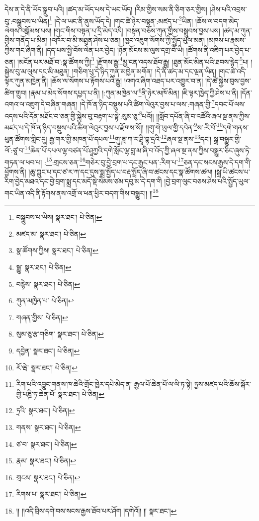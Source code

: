 དེས་ན་དེ་ནི་ཡོད་སྒྲུབ་པའི། །ཚད་མ་ཡོད་པས་དེ་ཡང་ཡོད། །རིམ་གྱིས་སམ་ནི་ཅིག་ཅར་གྱིས། །ཤེས་པའི་འབྲས་བུ་:བསྒྲུབས་པ་ཡིན།\footnote{བསྒྲུབས་པ་ཡིས།  སྣར་ཐང་།  པེ་ཅིན། } །དེ་ལ་ཡང་ནི་ནུས་ཡོད་དེ། །གང་ཚེ་ཉེར་བསྟན་:མཛད་པ་\footnote{མཛད་མ་  སྣར་ཐང་།  པེ་ཅིན། }ཡིན། །ཆོས་ལ་བདག་མེད་ལེགས་བསྒོམས་པས། །གང་གིས་བསྟན་པ་དྲི་མེད་འདི། །བསྟན་བཅོས་ཀུན་གྱིས་བསྒྲུབས་བྱས་པས། །ཚད་མ་ཀུན་གྱིས་གནོད་པ་མིན། །འཁོར་བ་མི་མཐུན་ཤེས་པ་ཅན། །ཁྱབ་འཇུག་སོགས་ཀྱི་སྤྱོད་ཡུལ་མན། །མཁས་པ་རྣམས་ཀྱིས་གང་ཞིག་ནི། །དད་པས་སྤྱི་བོས་ལེན་པར་བྱེད། །ཉོན་མོངས་མ་ལུས་དགྲ་བོ་ཡི། །ཚོགས་ནི་འཇིག་པར་བྱེད་པ་ཅན། །མངོན་པར་མཐོ་བ་:སྣ་ཚོགས་ཀྱི།\footnote{སྣ་ཚོགས་ཀྱིས།  སྣར་ཐང་།  པེ་ཅིན། } །རྫོགས་རྒྱུ་\footnote{སྒྱུ་  སྣར་ཐང་།  པེ་ཅིན། }མྱ་ངན་འདས་ཐོབ་རྒྱུ། །ཐུན་མོང་མིན་པའི་ཐབས་རྙེད་\footnote{བརྙེས་  སྣར་ཐང་།  པེ་ཅིན། }པ། །སྐྱེས་བུ་མ་ལུས་དང་མི་མཐུན། །གཅིག་པུ་དེ་ཉིད་ཀུན་མཁྱེན་མགོན། །དེ་ནི་ཚད་མ་དང་ལྡན་ཡིན། །གང་ཚེ་འདི་ལྟར་ཀུན་མཁྱེན་ནི། །ཆོས་ལ་སོགས་པ་རྟོགས་པའི་རྒྱུ། །འགའ་ཞིག་འཐད་པར་འགྱུར་བ་ན། །དེ་ཚེ་སྐྱེས་བུས་བྱས་ཚིག་གྲུབ། །རྣམ་པ་མེད་སོགས་དཔྱད་པ་ནི། །:ཀུན་མཁྱེན་ལ་\footnote{ཀུན་མཁྱེན་པ་  པེ་ཅིན། }ནི་ཉེར་མཁོ་མིན། །ཇི་ལྟར་ཁྱེད་ཀྱི་ཤེས་པ་ནི། །དོན་འགའ་ལ་འཇུག་དེ་བཞིན་གཞན། །དེ་ཁོ་ན་ཉིད་བསྡུས་པའི་ཚིག་ལེའུར་བྱས་པ་ལས་:གཞན་གྱི་\footnote{གཞན་གྱིས་  པེ་ཅིན། }དབང་པོ་ལས་འདས་པའི་དོན་མཐོང་བ་ཅན་གྱི་སྐྱེས་བུ་བརྟག་པ་སྟེ་:སུམ་ཅུ་\footnote{སུམ་ཅུ་རྩ་གཅིག་  སྣར་ཐང་།  པེ་ཅིན། }པའོ།། །།སློབ་དཔོན་ཞི་བ་འཚོའི་ཞལ་སྔ་ནས་ཀྱིས་མཛད་པ་དེ་ཁོ་ན་ཉིད་བསྡུས་པའི་ཚིག་ལེའུར་བྱས་པ་རྫོགས་སོ།། །།གུ་གེ་ཡུལ་གྱི་དབེན་\footnote{དབྱེན་  སྣར་ཐང་།  པེ་ཅིན། }ས་:རི་བོ་\footnote{རོ་ཝེ་  སྣར་ཐང་།  པེ་ཅིན། }དགེ་གནས་ཕུན་ཚོགས་གླིང་དུ། རྒྱ་གར་གྱི་མཁན་པོ་དཔལ་\footnote{རིག་པའི་འབྱུང་གནས་ཁ་ཆེའི་གྲོང་ཁྱེར་དཔེ་མེད་ན། རྒྱལ་པོ་ཆེན་པོ་ལ་ལི་ཏ་སྟེ། ཏྱས་མཛད་པའི་ཆོས་སྐོར་གྱི་པཎྜི་ཏ་ཆེན་པོ་  སྣར་ཐང་།  པེ་ཅིན། }གུ་ཎཱ་ཀ་ར་ཤྲཱི་བྷ་དྲའི་\footnote{ཏྲའི་  སྣར་ཐང་།  པེ་ཅིན། }ཞལ་སྔ་ནས་\footnote{གནས་  སྣར་ཐང་།  པེ་ཅིན། }དང་། སྒྲ་བསྒྱུར་གྱི་ལོ་:ཙཱ་བ་\footnote{ཙ་བ་  སྣར་ཐང་།  པེ་ཅིན། }ཆེན་པོ་དཔལ་ལྷ་བཙན་པོ་ཤཱཀྱའི་དགེ་སློང་ལྷ་བླ་མ་ཞི་བ་འོད་ཀྱི་ཞལ་སྔ་ནས་ཀྱིས་བསྒྱུར་ཅིང་ཞུས་ཏེ་གཏན་ལ་ཕབ་པ། :\footnote{རྣམ་  སྣར་ཐང་།  པེ་ཅིན། }:གྲངས་ཅན་\footnote{གྲངས་  སྣར་ཐང་།  པེ་ཅིན། }གཅེར་བུ་བྱེ་བྲག་པ་དང་རྒྱང་པན་:རིག་པ་\footnote{རིགས་པ་  སྣར་ཐང་།  པེ་ཅིན། }ཅན་དང་སངས་རྒྱས་དེ་དག་གི་ཕྱོགས་ནི། །ཆུ་ཀླུང་པ་དང་ཙ་ར་ཀ་དང་དུས་སྨྲ་སྤྱོད་པ་བརྡ་སྤྲོད་ཞི་བ་ཚངས་དང་སྣ་ཚོགས་ཚལ། །སྒྲ་ཡི་ཚངས་པ་རིག་བྱེད་མཐའ་དང་བྱེ་བྲག་སྨྲ་དང་མདོ་སྡེ་སེམས་ཙམ་དབུ་མ་དེ་དག་གི །བྱེ་བྲག་ལུང་བཅས་ཤེས་པའི་སྤྱོད་ཡུལ་གང་ཡིན་འདི་ནི་རྟོགས་ནས་འགྲོ་ལ་ཕན་ཕྱིར་བདག་གིས་བསྒྱུར།། །།\footnote{།། །།འདི་བྲིས་དགེ་བས་སངས་རྒྱས་ཐོབ་པར་ཤོག །དགེའོ།། །།  སྣར་ཐང་། }